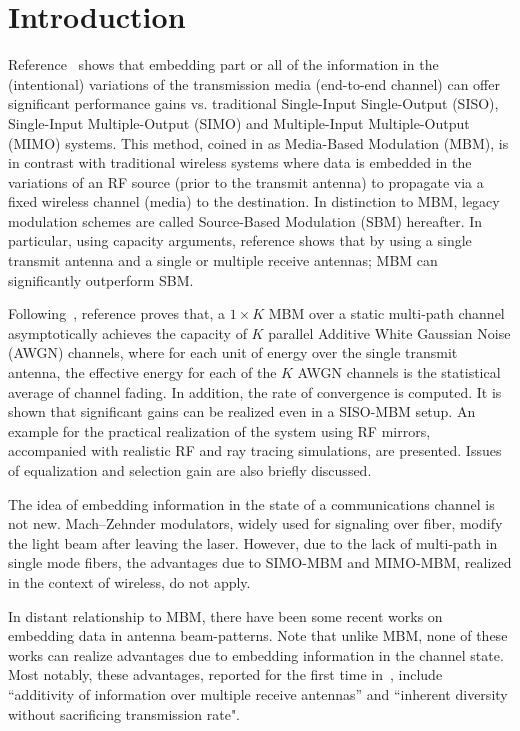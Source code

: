 \section{Introduction}
Reference~\cite{c0} shows that embedding part or all of the
information in the (intentional) variations of the
transmission media (end-to-end channel) can offer
significant performance gains vs. traditional Single-Input Single-Output (SISO), Single-Input Multiple-Output (SIMO)
and Multiple-Input Multiple-Output (MIMO) systems. This method, coined in \cite{c0} as Media-Based Modulation (MBM), is in contrast with traditional wireless
systems where data is embedded in the
variations of an RF source (prior to the transmit antenna) to propagate via a fixed wireless channel (media) to the destination. In distinction to MBM, legacy modulation schemes are called Source-Based Modulation (SBM) hereafter. In particular, using capacity arguments, reference \cite{c0} shows that by using a single transmit antenna and a single or multiple receive antennas; MBM can significantly outperform SBM.

Following~\cite{c0}, reference \cite{isit2014}
proves that, a $1 \times K$ MBM over a
static multi-path channel asymptotically achieves the capacity
of $K$ parallel Additive White Gaussian Noise (AWGN) channels, where for each unit of energy
over the single transmit antenna, the effective energy for each
of the $K$ AWGN channels is the statistical average of channel
fading. In addition, the rate of convergence is computed. It is shown that significant gains
can be realized even in a SISO-MBM setup. An example
for the practical realization of the system using RF mirrors, accompanied with realistic RF and ray tracing simulations, are presented. Issues of equalization and selection
gain are also briefly discussed.

The idea of embedding information in the state of  a communications channel is not new. Mach–Zehnder modulators, widely used for signaling over fiber, modify the light beam after leaving the laser. However, due to the lack of multi-path in single mode fibers, the advantages due to SIMO-MBM and MIMO-MBM, realized in the context of wireless, do not apply. 

In distant relationship to MBM, there have been some recent works on embedding data in antenna beam-patterns. Note that unlike MBM, none of these works can realize advantages due to embedding information in the channel state. Most notably, these advantages, reported for the first time in~\cite{c0, isit2014}, include ``additivity of information over multiple receive antennas'' and ``inherent diversity without sacrificing transmission rate".

